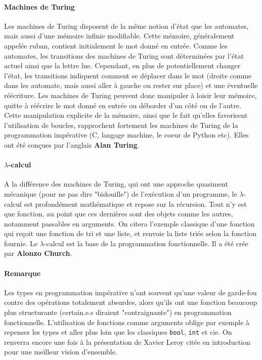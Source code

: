 \paragraph{Machines de Turing} Les machines de Turing disposent de la même notion d'état que les automates, mais aussi d'une mémoire infinie modifiable. Cette mémoire, généralement appelée ruban, contient initialement le mot donné en entrée. Comme les automates, les transitions des machines de Turing sont déterminées par l'état actuel ainsi que la lettre lue. Cependant, en plus de potentiellement changer l'état, les transitions indiquent comment se déplacer dans le mot (droite comme dans les automate, mais aussi aller à gauche ou rester sur place) et une éventuelle réécriture. Les machines de Turing peuvent donc manipuler à loisir leur mémoire, quitte à réécrire le mot donné en entrée ou déborder d'un côté ou de l'autre. Cette manipulation explicite de la mémoire, ainsi que le fait qu'elles favorisent l'utilisation de boucles, rapprochent fortement les machines de Turing de la programmation impérative (C, langage machine, le coeur de Python etc). Elles ont été conçues par l'anglais \textbf{Alan Turing}.

\paragraph{$\lambda$-calcul} A la différence des machines de Turing, qui ont une approche quasiment mécanique (pour ne pas dire "bidouille") de l'exécution d'un programme, le $\lambda$-calcul est profondément mathématique et repose sur la récursion. Tout n'y est que fonction, au point que ces dernières sont des objets comme les autres, notamment passables en arguments. On citera l'exemple classique d'une fonction qui reçoit une fonction de tri et une liste, et renvoie la liste triée selon la fonction fournie. Le $\lambda$-calcul est la base de la programmation fonctionnelle. Il a été crée par \textbf{Alonzo Church}.

\paragraph{Remarque} Les types en programmation impérative n'ont souvent qu'une valeur de garde-fou contre des opérations totalement absurdes, alors qu'ils ont une fonction beaucoup plus structurante (certain.e.s diraient "contraignante") en programmation fonctionnelle. L'utilisation de fonctions comme arguments oblige par exemple à repenser les types et aller plus loin que les classiques \verb!bool!, \verb!int! et cie. On renverra encore une fois à la présentation de Xavier Leroy citée en introduction pour une meilleur vision d'ensemble.

